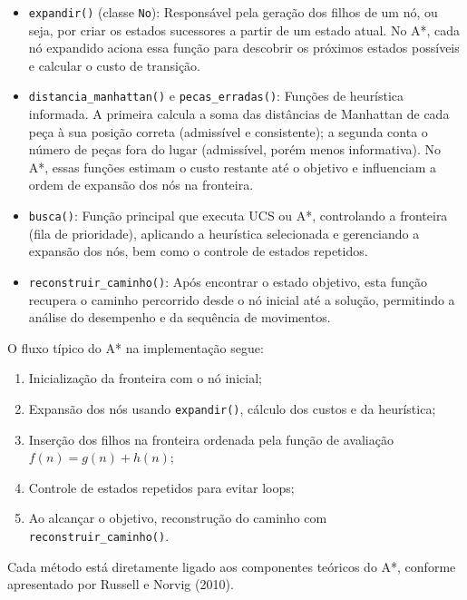 \begin{itemize}  
    \item \texttt{expandir()} (classe \texttt{No}): Responsável pela geração dos filhos de um nó, ou seja, por criar os estados sucessores a partir de um estado atual. No A*, cada nó expandido aciona essa função para descobrir os próximos estados possíveis e calcular o custo de transição.  
    \item \texttt{distancia\_manhattan()} e \texttt{pecas\_erradas()}: Funções de heurística informada. A primeira calcula a soma das distâncias de Manhattan de cada peça à sua posição correta (admissível e consistente); a segunda conta o número de peças fora do lugar (admissível, porém menos informativa). No A*, essas funções estimam o custo restante até o objetivo e influenciam a ordem de expansão dos nós na fronteira.  
    \item \texttt{busca()}: Função principal que executa UCS ou A*, controlando a fronteira (fila de prioridade), aplicando a heurística selecionada e gerenciando a expansão dos nós, bem como o controle de estados repetidos.  
    \item \texttt{reconstruir\_caminho()}: Após encontrar o estado objetivo, esta função recupera o caminho percorrido desde o nó inicial até a solução, permitindo a análise do desempenho e da sequência de movimentos.  
\end{itemize}  
  
O fluxo típico do A* na implementação segue:  
\begin{enumerate}  
    \item Inicialização da fronteira com o nó inicial;  
    \item Expansão dos nós usando \texttt{expandir()}, cálculo dos custos e da heurística;  
    \item Inserção dos filhos na fronteira ordenada pela função de avaliação $f(n) = g(n) + h(n)$;  
    \item Controle de estados repetidos para evitar loops;  
    \item Ao alcançar o objetivo, reconstrução do caminho com \texttt{reconstruir\_caminho()}.  
\end{enumerate}  
Cada método está diretamente ligado aos componentes teóricos do A*, conforme apresentado por Russell e Norvig (2010).  
  
